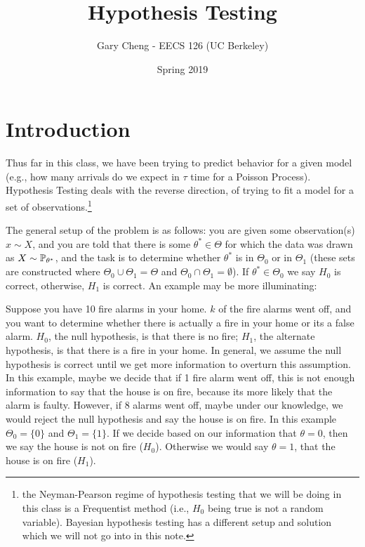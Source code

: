 \documentclass{article}
\title{Hypothesis Testing}
\author{Gary Cheng - EECS 126 (UC Berkeley)}
\date{Spring 2019}
\begin{document}
\maketitle
\section{Introduction}
Thus far in this class, we have been trying to predict behavior for a given model (e.g., how many arrivals do we expect in $\tau$ time for a Poisson Process). Hypothesis Testing deals with the reverse direction, of trying to fit a model for a set of observations.\footnote{the Neyman-Pearson regime of hypothesis testing that we will be doing in this class is a Frequentist method (i.e., $H_0$ being true is not a random variable). Bayesian hypothesis testing has a different setup and solution which we will not go into in this note.}

The general setup of the problem is as follows: you are given some observation(s) $x \sim X$, and you are told that there is some $\theta^* \in \Theta$ for which the data was drawn as $X \sim \operatorname{\mathbb{P}}_{\theta^*}$, and the task is to determine whether $\theta^*$ is in $\Theta_0$ or in $\Theta_1$ (these sets are constructed where $\Theta_0 \cup \Theta_1 = \Theta$ and $\Theta_0 \cap \Theta_1 = \emptyset$). If $\theta^* \in \Theta_0$ we say $H_0$ is correct, otherwise, $H_1$ is correct. An example may be more illuminating: 


\begin{example}
Suppose you have 10 fire alarms in your home. $k$ of the fire alarms went off, and you want to determine whether there is actually a fire in your home or its a false alarm. $H_0$, the null hypothesis, is that there is no fire; $H_1$, the alternate hypothesis, is that there is a fire in your home. In general, we assume the null hypothesis is correct until we get more information to overturn this assumption. In this example, maybe we decide that if 1 fire alarm went off, this is not enough information to say that the house is on fire, because its more likely that the alarm is faulty. However, if 8 alarms went off, maybe under our knowledge, we would reject the null hypothesis and say the house is on fire. In this example $\Theta_0 = \{ 0 \}$ and $\Theta_1 = \{ 1\}$. If we decide based on our information that $\theta = 0$, then we say the house is not on fire ($H_0$). Otherwise we would say $\theta = 1$, that the house is on fire ($H_1$). 
\end{example}
\end{document}
